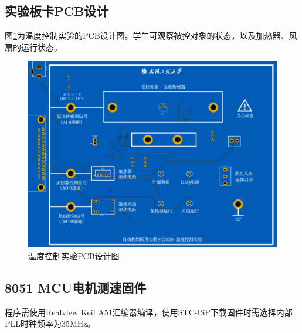\documentclass[11pt,a4paper]{article}
\begin{document}
\subsection{实验板卡PCB设计}
图\ref{temp_board}为温度控制实验的PCB设计图。学生可观察被控对象的状态，以及加热器、风扇的运行状态。
\begin{figure}[h!]\centering
  \includegraphics[width=14cm]{./figs/temp_board.png}
  \caption{温度控制实验PCB设计图}\label{temp_board}
\end{figure}

\begin{appendices}
  \section{8051 MCU电机测速固件}
  程序需使用Realview Keil A51汇编器编译，使用STC-ISP下载固件时需选择内部PLL时钟频率为35MHz。
  

\end{appendices}
\end{document}
